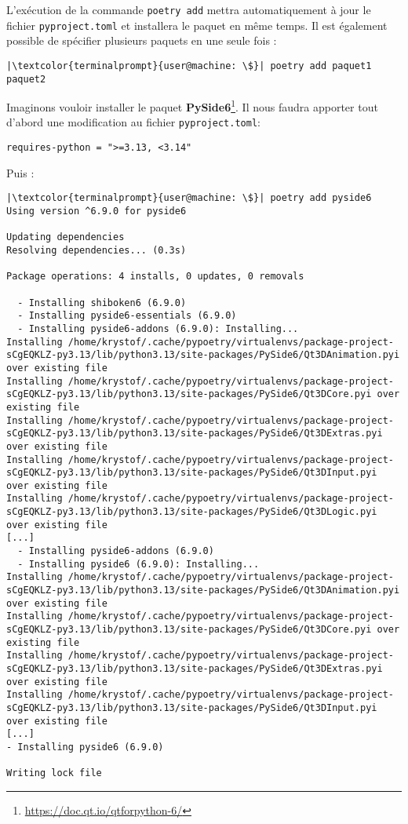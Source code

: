 L'exécution de la commande \texttt{poetry add} mettra automatiquement à jour le fichier \texttt{pyproject.toml} et installera le paquet en même temps. Il est également possible de spécifier plusieurs paquets en une seule fois :
\begin{lstlisting}[style=terminal]
|\textcolor{terminalprompt}{user@machine: \$}| poetry add paquet1 paquet2
\end{lstlisting}

Imaginons vouloir installer le paquet \textbf{PySide6}\footnote{\url{https://doc.qt.io/qtforpython-6/}}. Il nous faudra apporter tout d'abord une modification au fichier \texttt{pyproject.toml}:
\begin{verbatim}
requires-python = ">=3.13, <3.14"
\end{verbatim}

Puis :
\begin{lstlisting}[style=terminal]
|\textcolor{terminalprompt}{user@machine: \$}| poetry add pyside6
Using version ^6.9.0 for pyside6

Updating dependencies
Resolving dependencies... (0.3s)

Package operations: 4 installs, 0 updates, 0 removals

  - Installing shiboken6 (6.9.0)
  - Installing pyside6-essentials (6.9.0)
  - Installing pyside6-addons (6.9.0): Installing...
Installing /home/krystof/.cache/pypoetry/virtualenvs/package-project-sCgEQKLZ-py3.13/lib/python3.13/site-packages/PySide6/Qt3DAnimation.pyi over existing file
Installing /home/krystof/.cache/pypoetry/virtualenvs/package-project-sCgEQKLZ-py3.13/lib/python3.13/site-packages/PySide6/Qt3DCore.pyi over existing file
Installing /home/krystof/.cache/pypoetry/virtualenvs/package-project-sCgEQKLZ-py3.13/lib/python3.13/site-packages/PySide6/Qt3DExtras.pyi over existing file
Installing /home/krystof/.cache/pypoetry/virtualenvs/package-project-sCgEQKLZ-py3.13/lib/python3.13/site-packages/PySide6/Qt3DInput.pyi over existing file
Installing /home/krystof/.cache/pypoetry/virtualenvs/package-project-sCgEQKLZ-py3.13/lib/python3.13/site-packages/PySide6/Qt3DLogic.pyi over existing file
[...]
  - Installing pyside6-addons (6.9.0)
  - Installing pyside6 (6.9.0): Installing...
Installing /home/krystof/.cache/pypoetry/virtualenvs/package-project-sCgEQKLZ-py3.13/lib/python3.13/site-packages/PySide6/Qt3DAnimation.pyi over existing file
Installing /home/krystof/.cache/pypoetry/virtualenvs/package-project-sCgEQKLZ-py3.13/lib/python3.13/site-packages/PySide6/Qt3DCore.pyi over existing file
Installing /home/krystof/.cache/pypoetry/virtualenvs/package-project-sCgEQKLZ-py3.13/lib/python3.13/site-packages/PySide6/Qt3DExtras.pyi over existing file
Installing /home/krystof/.cache/pypoetry/virtualenvs/package-project-sCgEQKLZ-py3.13/lib/python3.13/site-packages/PySide6/Qt3DInput.pyi over existing file
[...]
- Installing pyside6 (6.9.0)

Writing lock file
\end{lstlisting}

